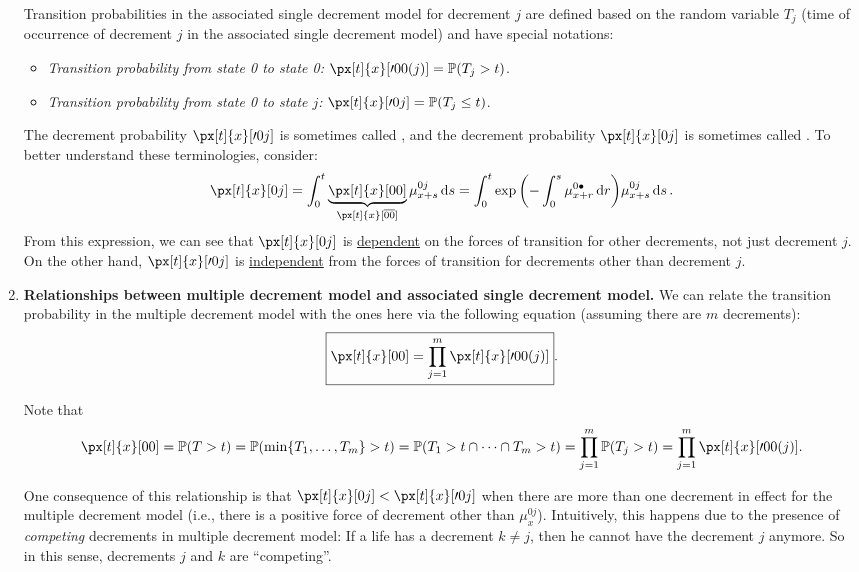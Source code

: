 \begin{enumerate}
Transition probabilities in the associated single decrement model for decrement
\(j\) are defined based on the random variable \(T_j\) (time of occurrence of
decrement \(j\) in the associated single decrement model) and have special
notations:
\begin{itemize}
\item \emph{Transition probability from state 0 to state 0:} \(\px[t]{x}[\prime 00(j)]=\prob{T_j>t}\).
\item \emph{Transition probability from state 0 to state \(j\):} \(\px[t]{x}[\prime 0j]=\prob{T_j\le t}\).
\end{itemize}
\begin{note}
The decrement probability \(\px[t]{x}[\prime 0j]\) is sometimes called
, and the decrement probability \(\px[t]{x}[0j]\)
is sometimes called . To better understand these
terminologies, consider:
\[
\px[t]{x}[0j]=\int_{0}^{t}\underbrace{\px[t]{x}[00]}_{\px[t]{x}[\overline{00}]}\mu_{x+s}^{0j}\dd{s}
=\int_{0}^{t}\exp\qty(-\int_{0}^{s}\mu_{x+r}^{0\bullet}\dd{r})\mu_{x+s}^{0j}\dd{s}.
\]
From this expression, we can see that \(\px[t]{x}[0j]\) is
\underline{dependent} on the forces of transition for other decrements, not
just decrement \(j\). On the other hand, \(\px[t]{x}[\prime 0j]\) is
\underline{independent} from the forces of transition for decrements other than
decrement \(j\).
\end{note}

\item \label{it:mult-decr-asso-single-decr-relate} \textbf{Relationships between
multiple decrement model and associated single decrement model.} We can relate
the transition probability in the multiple decrement model with the ones here
via the following equation (assuming there are \(m\) decrements):
\[
\boxed{\px[t]{x}[00]=\prod_{j=1}^{m}\px[t]{x}[\prime 00(j)]}.
\]
\begin{pf}
Note that
\[
\px[t]{x}[00]=\prob{T>t}
=\prob{\min\{T_1,\dotsc,T_m\}>t}
=\prob{T_1>t\cap\dotsb\cap T_m>t}
=\prod_{j=1}^{m}\prob{T_j>t}
=\prod_{j=1}^{m}\px[t]{x}[\prime 00(j)].
\]
\end{pf}

One consequence of this relationship is that \(\px[t]{x}[0j]<\px[t]{x}[\prime
0j]\) when there are more than one decrement in effect for the multiple
decrement model (i.e., there is a positive force of decrement other than
\(\mu_{x}^{0j}\)). Intuitively, this happens due to the presence of
\emph{competing} decrements in multiple decrement model: If a life has a
decrement \(k\ne j\), then he cannot have the decrement \(j\) anymore. So in
this sense, decrements \(j\) and \(k\) are ``competing''.


\end{enumerate}
